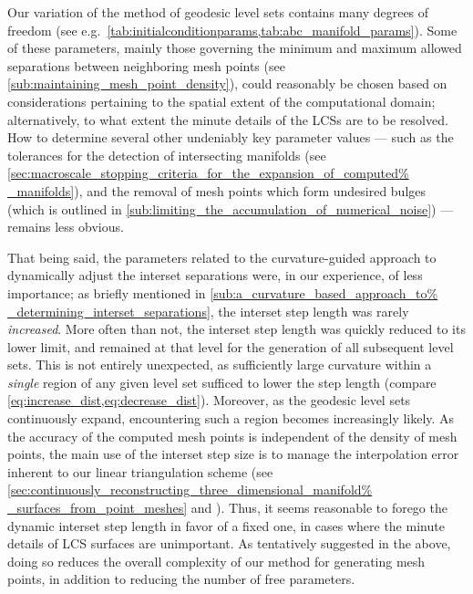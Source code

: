 Our variation of the method of geodesic level sets contains many
degrees of freedom (see e.g.\
\cref{tab:initialconditionparams,tab:abc_manifold_params}). Some of these
parameters, mainly those governing the minimum and maximum allowed separations
between neighboring mesh points (see
\cref{sub:maintaining_mesh_point_density}), could reasonably be chosen based on
considerations pertaining to the spatial extent of the computational domain;
alternatively, to what extent the minute details of the LCSs are to be
resolved. How to determine several other undeniably key parameter values ---
such as the tolerances  for the detection of intersecting manifolds (see
\cref{sec:macroscale_stopping_criteria_for_the_expansion_of_computed%
_manifolds}), and the removal of mesh points which form undesired bulges (which
is outlined in \cref{sub:limiting_the_accumulation_of_numerical_noise}) ---
remains less obvious.

That being said, the parameters related to the curvature-guided approach to
dynamically adjust the interset separations were, in our experience, of less
importance; as briefly mentioned in \cref{sub:a_curvature_based_approach_to%
_determining_interset_separations}, the interset step length was rarely
\emph{increased}. More often than not, the interset step length was quickly
reduced to its lower limit, and remained at that level for the generation of
all subsequent level sets. This is not entirely unexpected, as sufficiently
large curvature within a \emph{single} region of any given level set sufficed
to lower the step length (compare \cref{eq:increase_dist,eq:decrease_dist}).
Moreover, as the geodesic level sets continuously expand, encountering such a
region becomes increasingly likely. As the accuracy of the computed mesh points
is independent of the density of mesh points, the main use of the interset step
size is to manage the interpolation error inherent to our linear triangulation
scheme (see \cref{sec:continuously_reconstructing_three_dimensional_manifold%
_surfaces_from_point_meshes} and \textcite{krauskopf2003computing}). Thus, it
seems reasonable to forego the dynamic interset step length in favor of a
fixed one, in cases where the minute details of LCS surfaces are unimportant.
As tentatively suggested in the above, doing so reduces the overall complexity
of our method for generating mesh points, in addition to reducing the number
of free parameters.


